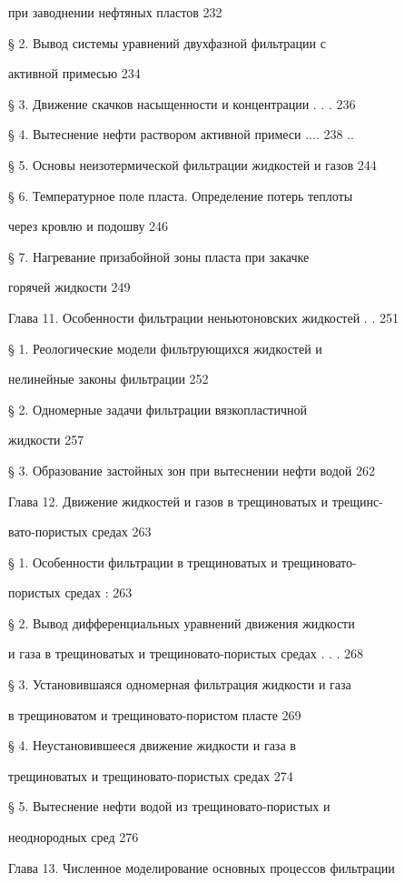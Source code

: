 \documentclass[
  11pt,
]{article}
\begin{document}
при заводнении нефтяных пластов 232 \par
§ 2. Вывод системы уравнений двухфазной фильтрации с  \par
активной примесью 234 \par
§ 3. Движение скачков насыщенности и концентрации . . . 236 \par
§ 4. Вытеснение нефти раствором активной примеси .... 238 .. \par
§ 5. Основы неизотермической фильтрации жидкостей и газов 244 \par
§ 6. Температурное поле пласта. Определение потерь теплоты \par
через кровлю и подошву 246 \par
§ 7. Нагревание призабойной зоны пласта при закачке  \par
горячей жидкости 249 \par
Глава 11. Особенности фильтрации неньютоновских жидкостей . . 251 \par
§ 1. Реологические модели фильтрующихся жидкостей и  \par
нелинейные законы фильтрации 252 \par
§ 2. Одномерные задачи фильтрации вязкопластичной  \par
жидкости 257 \par
§ 3. Образование застойных зон при вытеснении нефти водой 262 \par
Глава 12. Движение жидкостей и газов в трещиноватых и трещинс- \par
вато-пористых средах 263 \par
§ 1. Особенности фильтрации в трещиноватых и трещиновато- \par
пористых средах : 263 \par
§ 2. Вывод дифференциальных уравнений движения жидкости \par
и газа в трещиноватых и трещиновато-пористых средах . . . 268 \par
§ 3. Установившаяся одномерная фильтрация жидкости и газа \par
в трещиноватом и трещиновато-пористом пласте 269 \par
§ 4. Неустановившееся движение жидкости и газа в  \par
трещиноватых и трещиновато-пористых средах 274 \par
§ 5. Вытеснение нефти водой из трещиновато-пористых и  \par
неоднородных сред 276 \par
Глава 13. Численное моделирование основных процессов фильтрации \par
\end{document}
